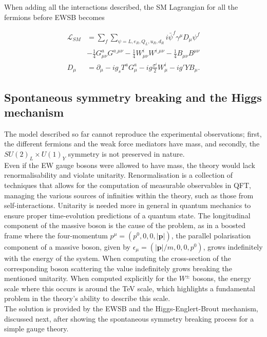 When adding all the interactions described, the SM Lagrangian for all the fermions before \acrshort{EWSB} becomes

\begin{equation}
    \label{Theory_eq:SMbeforeEWSB}
    \begin{split}
    \mathcal{L}_{SM} &= \sum_f\sum_{\psi=L,e_R,Q_L,u_R,d_R} i\bar{\psi}^f\gamma^\mu D_\mu \psi^f\\
    &- \frac{1}{4}G^a_{\mu\nu}G^{a\_\mu\nu} - \frac{1}{4}W^i_{\mu\nu}W^{i\_\mu\nu} - \frac{1}{4}B_{\mu\nu}B^{\mu\nu}\\
    D_\mu &= \partial_\mu - i g_s T^a G^a_\mu - i g \frac{\sigma^i}{2}W_\mu^i - ig'YB_\mu.
    \end{split}
\end{equation}

\subsection{Spontaneous symmetry breaking and the Higgs mechanism}
\label{subsec:SSB}
The model described so far cannot reproduce the experimental observations; first, the different fermions and the weak force mediators have mass, and secondly, the $SU(2)_L\times U(1)_Y$ symmetry is not preserved in nature.\\

Even if the \acrshort{EW} gauge bosons were allowed to have mass, the theory would lack renormalisability and violate unitarity. Renormalisation is a collection of techniques that allows for the computation of measurable observables in \acrshort{QFT}, managing the various sources of infinities within the theory, such as those from self-interactions.
Unitarity is needed more in general in quantum mechanics to ensure proper time-evolution predictions of a quantum state. The longitudinal component of the massive boson is the cause of the problem,
as in a boosted frame where the four-momentum $p^\mu=(p^0,0,0,|\textbf{p}|)$, the parallel polarisation component of a massive boson, given by $\epsilon_\mu=(|\textbf{p}|/m,0,0,p^0)$, grows indefinitely with the energy of the system.
When computing the cross-section of the corresponding boson scattering the value indefinitely grows breaking the mentioned unitarity.
When computed explicitly for the $W^\pm$ bosons, the energy scale where this occurs is around the TeV scale, which highlights a fundamental problem in the theory's ability to describe this scale.\\

The solution is provided by the \acrshort{EWSB} and the Higgs-Englert-Brout mechanism, discussed next, after showing the spontaneous
symmetry breaking process for a simple gauge theory.

